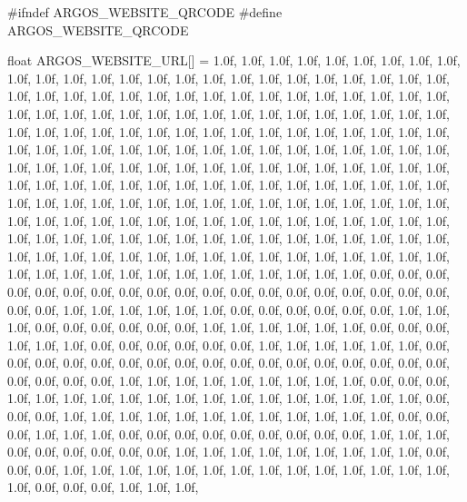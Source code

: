 #ifndef ARGOS_WEBSITE_QRCODE
#define ARGOS_WEBSITE_QRCODE
   
float ARGOS_WEBSITE_URL[] = {
   1.0f, 1.0f, 1.0f,   1.0f, 1.0f, 1.0f,   1.0f, 1.0f, 1.0f,   1.0f, 1.0f, 1.0f,   1.0f, 1.0f, 1.0f,   1.0f, 1.0f, 1.0f,   1.0f, 1.0f, 1.0f,   1.0f, 1.0f, 1.0f,   1.0f, 1.0f, 1.0f,   1.0f, 1.0f, 1.0f,   1.0f, 1.0f, 1.0f,   1.0f, 1.0f, 1.0f,   1.0f, 1.0f, 1.0f,   1.0f, 1.0f, 1.0f,   1.0f, 1.0f, 1.0f,   1.0f, 1.0f, 1.0f,   1.0f, 1.0f, 1.0f,   1.0f, 1.0f, 1.0f,   1.0f, 1.0f, 1.0f,   1.0f, 1.0f, 1.0f,   1.0f, 1.0f, 1.0f,   1.0f, 1.0f, 1.0f,   1.0f, 1.0f, 1.0f,   1.0f, 1.0f, 1.0f,   1.0f, 1.0f, 1.0f,   1.0f, 1.0f, 1.0f,   1.0f, 1.0f, 1.0f,   1.0f, 1.0f, 1.0f,   1.0f, 1.0f, 1.0f,   1.0f, 1.0f, 1.0f,   1.0f, 1.0f, 1.0f,   1.0f, 1.0f, 1.0f,   
   1.0f, 1.0f, 1.0f,   1.0f, 1.0f, 1.0f,   1.0f, 1.0f, 1.0f,   1.0f, 1.0f, 1.0f,   1.0f, 1.0f, 1.0f,   1.0f, 1.0f, 1.0f,   1.0f, 1.0f, 1.0f,   1.0f, 1.0f, 1.0f,   1.0f, 1.0f, 1.0f,   1.0f, 1.0f, 1.0f,   1.0f, 1.0f, 1.0f,   1.0f, 1.0f, 1.0f,   1.0f, 1.0f, 1.0f,   1.0f, 1.0f, 1.0f,   1.0f, 1.0f, 1.0f,   1.0f, 1.0f, 1.0f,   1.0f, 1.0f, 1.0f,   1.0f, 1.0f, 1.0f,   1.0f, 1.0f, 1.0f,   1.0f, 1.0f, 1.0f,   1.0f, 1.0f, 1.0f,   1.0f, 1.0f, 1.0f,   1.0f, 1.0f, 1.0f,   1.0f, 1.0f, 1.0f,   1.0f, 1.0f, 1.0f,   1.0f, 1.0f, 1.0f,   1.0f, 1.0f, 1.0f,   1.0f, 1.0f, 1.0f,   1.0f, 1.0f, 1.0f,   1.0f, 1.0f, 1.0f,   1.0f, 1.0f, 1.0f,   1.0f, 1.0f, 1.0f,   
   1.0f, 1.0f, 1.0f,   1.0f, 1.0f, 1.0f,   0.0f, 0.0f, 0.0f,   0.0f, 0.0f, 0.0f,   0.0f, 0.0f, 0.0f,   0.0f, 0.0f, 0.0f,   0.0f, 0.0f, 0.0f,   0.0f, 0.0f, 0.0f,   0.0f, 0.0f, 0.0f,   1.0f, 1.0f, 1.0f,   1.0f, 1.0f, 1.0f,   0.0f, 0.0f, 0.0f,   0.0f, 0.0f, 0.0f,   1.0f, 1.0f, 1.0f,   0.0f, 0.0f, 0.0f,   0.0f, 0.0f, 0.0f,   1.0f, 1.0f, 1.0f,   1.0f, 1.0f, 1.0f,   0.0f, 0.0f, 0.0f,   1.0f, 1.0f, 1.0f,   0.0f, 0.0f, 0.0f,   0.0f, 0.0f, 0.0f,   1.0f, 1.0f, 1.0f,   1.0f, 1.0f, 1.0f,   0.0f, 0.0f, 0.0f,   0.0f, 0.0f, 0.0f,   0.0f, 0.0f, 0.0f,   0.0f, 0.0f, 0.0f,   0.0f, 0.0f, 0.0f,   0.0f, 0.0f, 0.0f,   0.0f, 0.0f, 0.0f,   1.0f, 1.0f, 1.0f,   
   1.0f, 1.0f, 1.0f,   1.0f, 1.0f, 1.0f,   0.0f, 0.0f, 0.0f,   1.0f, 1.0f, 1.0f,   1.0f, 1.0f, 1.0f,   1.0f, 1.0f, 1.0f,   1.0f, 1.0f, 1.0f,   1.0f, 1.0f, 1.0f,   0.0f, 0.0f, 0.0f,   1.0f, 1.0f, 1.0f,   1.0f, 1.0f, 1.0f,   1.0f, 1.0f, 1.0f,   1.0f, 1.0f, 1.0f,   0.0f, 0.0f, 0.0f,   1.0f, 1.0f, 1.0f,   0.0f, 0.0f, 0.0f,   0.0f, 0.0f, 0.0f,   0.0f, 0.0f, 0.0f,   1.0f, 1.0f, 1.0f,   0.0f, 0.0f, 0.0f,   0.0f, 0.0f, 0.0f,   1.0f, 1.0f, 1.0f,   1.0f, 1.0f, 1.0f,   1.0f, 1.0f, 1.0f,   0.0f, 0.0f, 0.0f,   1.0f, 1.0f, 1.0f,   1.0f, 1.0f, 1.0f,   1.0f, 1.0f, 1.0f,   1.0f, 1.0f, 1.0f,   1.0f, 1.0f, 1.0f,   0.0f, 0.0f, 0.0f,   1.0f, 1.0f, 1.0f,   
}
